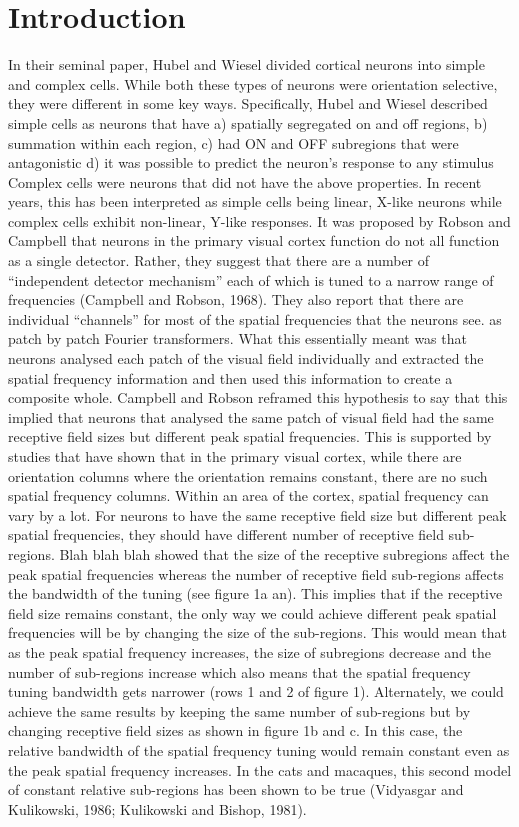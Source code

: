 	\section{Introduction}
	In their seminal paper, Hubel and Wiesel divided cortical neurons into simple and complex cells. While both these types of neurons were orientation selective, they were different in some key ways. Specifically, Hubel and Wiesel described simple cells as neurons that have
	a) spatially segregated on and off regions, 
	b) summation within each region, 
	c) had ON and OFF subregions that were antagonistic 
	d) it was possible to predict the neuron’s response to any stimulus
	Complex cells were neurons that did not have the above properties. In recent years, this has been interpreted as simple cells being linear, X-like neurons while complex cells exhibit non-linear, Y-like responses. 
	It was proposed by Robson and Campbell that neurons in the primary visual cortex function do not all function as a single detector. Rather, they suggest that there are a number of “independent detector mechanism” each of which is tuned to a narrow range of frequencies (Campbell and Robson, 1968).  They also report that there are individual “channels” for most of the spatial frequencies that the neurons see. as patch by patch Fourier transformers. What this essentially meant was that neurons analysed each patch of the visual field individually and extracted the spatial frequency information and then used this information to create a composite whole. Campbell and Robson reframed this hypothesis to say that this implied that neurons that analysed the same patch of visual field had the same receptive field sizes but different peak spatial frequencies. This is supported by studies that have shown that in the primary visual cortex, while there are orientation columns where the orientation remains constant, there are no such spatial frequency columns. Within an area of the cortex, spatial frequency can vary by a lot.
	For neurons to have the same receptive field size but different peak spatial frequencies, they should have different number of receptive field sub-regions. Blah blah blah showed that the size of the receptive subregions affect the peak spatial frequencies whereas the number of receptive field sub-regions affects the bandwidth of the tuning (see figure 1a an). This implies that if the receptive field size remains constant, the only way we could achieve different peak spatial frequencies will be by changing the size of the sub-regions. This would mean that as the peak spatial frequency increases, the size of subregions decrease and the number of sub-regions increase which also means that the spatial frequency tuning bandwidth gets narrower (rows 1 and 2 of figure 1). Alternately, we could achieve the same results by keeping the same number of sub-regions but by changing receptive field sizes as shown in figure 1b and c. In this case, the relative bandwidth of the spatial frequency tuning would remain constant even as the peak spatial frequency increases. In the cats and macaques, this second model of constant relative sub-regions has been shown to be true (Vidyasgar and Kulikowski, 1986; Kulikowski and Bishop, 1981).
